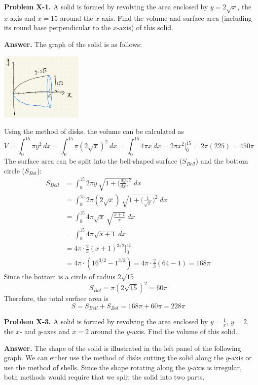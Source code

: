 \documentclass[11pt,letterpaper]{article}
\newcounter{problem}
\newcommand{\problem}[1]{
	\noindent \textbf{Problem #1. }%
}
\newcommand{\answer}{\noindent \textbf{Answer. }}
\begin{document}
\pagebreak

\problem{X-1} A solid is formed by revolving the area enclosed by $y = 2\sqrt{x}$, the $x$-axis and $x = 15$ around the $x$-axis.  Find the volume and surface area (including its round base perpendicular to the $x$-axis) of this solid. 

\smallskip

\answer The graph of the solid is as follows:
\begin{center}
    \includegraphics[width = 0.3\textwidth]{sol_rotate_x.png}
\end{center}
Using the method of disks, the volume can be calculated as 
\[V = \int_0^{15} \pi y^2~dx = \int_0^{15} \pi (2\sqrt{x})^2~dx = \int_0^{15} 4 \pi x~dx = 2 \pi x^2 \Big]_0^{15} = 2 \pi (225) = 450 \pi\]
The surface area can be split into the bell-shaped surface ($S_{Bell}$) and the bottom circle ($S_{Bot}$):
\begin{align*}
    S_{Bell} &= \int_0^{15} 2 \pi y~\sqrt{1+\big(\frac{dy}{dx}\big)^2}~dx \\
    &= \int_0^{15} 2 \pi (2\sqrt{x})~\sqrt{1 + \big(\frac{1}{\sqrt{x}}\big)^2}~dx\\
    &= \int_0^{15} 4 \pi \sqrt{x}~\sqrt{\frac{x+1}{x}}~dx\\
    &= \int_0^{15} 4 \pi \sqrt{x+1}~dx\\
    & = 4 \pi \cdot  \frac{2}{3}(x+1)^{3/2}\Big]_0^{15}\\
    &= 4 \pi \cdot (16^{3/2} - 1^{3/2}) = 4 \pi \cdot \frac{2}{3}(64-1) = 168 \pi
\end{align*}
Since the bottom is a circle of radius $2\sqrt{15}$
\[S_{Bot} = \pi (2\sqrt{15})^2 = 60 \pi\]
Therefore, the total surface area is 
\[S = S_{Bell} + S_{Bot} = 168 \pi + 60 \pi = 228 \pi\]

\pagebreak

\problem{X-3} A solid is formed by revolving the area enclosed by $y = \frac{1}{x}$, $y = 2$, the $x$- and $y$-axes and $x = 2$ around the $y$-axis.  Find the volume of this solid. 

\smallskip

\answer The shape of the solid is illustrated in the left panel of the following graph.  We can either use the method of disks cutting the solid along the $y$-axis or use the method of shells.  Since the shape rotating along the $y$-axis is irregular, both methods would require that we split the solid into two parts. 
\end{document}
